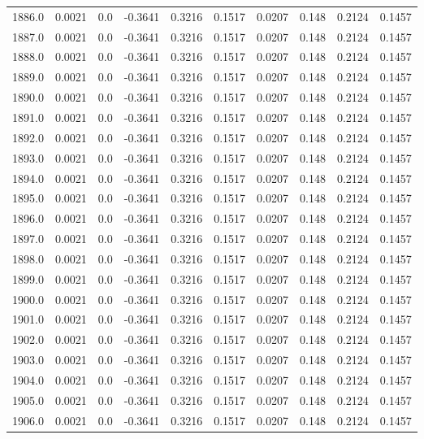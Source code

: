 \begin{longtable}{lrrrrrrrrr}
1886.0 & 0.0021 & 0.0 & -0.3641 & 0.3216 & 0.1517 & 0.0207 & 0.148 & 0.2124 & 0.1457 \\
1887.0 & 0.0021 & 0.0 & -0.3641 & 0.3216 & 0.1517 & 0.0207 & 0.148 & 0.2124 & 0.1457 \\
1888.0 & 0.0021 & 0.0 & -0.3641 & 0.3216 & 0.1517 & 0.0207 & 0.148 & 0.2124 & 0.1457 \\
1889.0 & 0.0021 & 0.0 & -0.3641 & 0.3216 & 0.1517 & 0.0207 & 0.148 & 0.2124 & 0.1457 \\
1890.0 & 0.0021 & 0.0 & -0.3641 & 0.3216 & 0.1517 & 0.0207 & 0.148 & 0.2124 & 0.1457 \\
1891.0 & 0.0021 & 0.0 & -0.3641 & 0.3216 & 0.1517 & 0.0207 & 0.148 & 0.2124 & 0.1457 \\
1892.0 & 0.0021 & 0.0 & -0.3641 & 0.3216 & 0.1517 & 0.0207 & 0.148 & 0.2124 & 0.1457 \\
1893.0 & 0.0021 & 0.0 & -0.3641 & 0.3216 & 0.1517 & 0.0207 & 0.148 & 0.2124 & 0.1457 \\
1894.0 & 0.0021 & 0.0 & -0.3641 & 0.3216 & 0.1517 & 0.0207 & 0.148 & 0.2124 & 0.1457 \\
1895.0 & 0.0021 & 0.0 & -0.3641 & 0.3216 & 0.1517 & 0.0207 & 0.148 & 0.2124 & 0.1457 \\
1896.0 & 0.0021 & 0.0 & -0.3641 & 0.3216 & 0.1517 & 0.0207 & 0.148 & 0.2124 & 0.1457 \\
1897.0 & 0.0021 & 0.0 & -0.3641 & 0.3216 & 0.1517 & 0.0207 & 0.148 & 0.2124 & 0.1457 \\
1898.0 & 0.0021 & 0.0 & -0.3641 & 0.3216 & 0.1517 & 0.0207 & 0.148 & 0.2124 & 0.1457 \\
1899.0 & 0.0021 & 0.0 & -0.3641 & 0.3216 & 0.1517 & 0.0207 & 0.148 & 0.2124 & 0.1457 \\
1900.0 & 0.0021 & 0.0 & -0.3641 & 0.3216 & 0.1517 & 0.0207 & 0.148 & 0.2124 & 0.1457 \\
1901.0 & 0.0021 & 0.0 & -0.3641 & 0.3216 & 0.1517 & 0.0207 & 0.148 & 0.2124 & 0.1457 \\
1902.0 & 0.0021 & 0.0 & -0.3641 & 0.3216 & 0.1517 & 0.0207 & 0.148 & 0.2124 & 0.1457 \\
1903.0 & 0.0021 & 0.0 & -0.3641 & 0.3216 & 0.1517 & 0.0207 & 0.148 & 0.2124 & 0.1457 \\
1904.0 & 0.0021 & 0.0 & -0.3641 & 0.3216 & 0.1517 & 0.0207 & 0.148 & 0.2124 & 0.1457 \\
1905.0 & 0.0021 & 0.0 & -0.3641 & 0.3216 & 0.1517 & 0.0207 & 0.148 & 0.2124 & 0.1457 \\
1906.0 & 0.0021 & 0.0 & -0.3641 & 0.3216 & 0.1517 & 0.0207 & 0.148 & 0.2124 & 0.1457 \\

\end{longtable}
